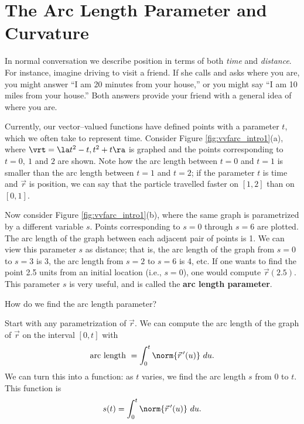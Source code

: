 \section{The Arc Length Parameter and Curvature}\label{sec:curvature}

In normal conversation we describe position in terms of both \emph{time} and \emph{distance}. For instance, imagine driving to visit a friend. If she calls and asks where you are, you might answer ``I am 20 minutes from your house,'' or you might say ``I am 10 miles from your house.'' Both answers provide your friend with a general idea of where you are.

Currently, our vector--valued functions have defined points with a parameter $t$, which we often take to represent time. Consider Figure \ref{fig:vvfarc_intro1}(a), where $\vrt = \la t^2-t,t^2+t\ra$ is graphed and the points corresponding to $t=0,\ 1$ and $2$ are shown. Note how the arc length between $t=0$ and $t=1$ is smaller than the arc length between $t=1$ and $t=2$; if the parameter $t$ is time and $\vec r$ is position, we can say that the particle travelled faster on $[1,2]$ than on $[0,1]$. 

Now consider Figure \ref{fig:vvfarc_intro1}(b), where the same graph is parametrized by a different variable $s$.  Points corresponding to $s=0$ through $s=6$ are plotted. The arc length of the graph between each adjacent pair of points is 1. We can view this parameter $s$ as distance; that is, the arc length of the graph from $s=0$ to $s=3$ is 3, the arc length from $s=2$ to $s=6$ is 4, etc. If one wants to find the point 2.5 units from an initial location (i.e., $s=0$), one would compute $\vec r(2.5)$. This parameter $s$ is very useful, and is called the \textbf{arc length parameter}.

How do we find the arc length parameter? 

Start with any parametrization of $\vec r$. We can compute the arc length of the graph of $\vec r$ on the interval $[0,t]$ with 
\[
\text{arc length } = \int_0^t\norm{\vec r\,'(u)}\ du.
\]
We can turn this into a function: as $t$ varies, we find the arc length $s$ from $0$ to $t$. This function is
\begin{equation}
s(t) = \int_0^t \norm{\vec r\,'(u)}\ du.\label{eq:vvfarc}
\end{equation}

